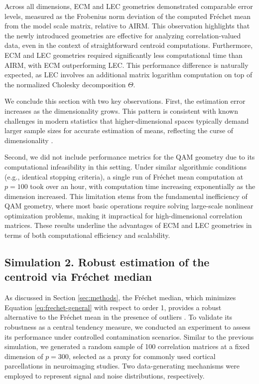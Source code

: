 \documentclass[10pt]{article}
\newcommand{\Frechet}{Fr\'{e}chet }
\begin{document}
Across all dimensions, ECM and LEC geometries demonstrated comparable error levels, measured as the Frobenius norm deviation of the computed \Frechet mean from the model scale matrix, relative to AIRM. This observation highlights that the newly introduced geometries are effective for analyzing correlation-valued data, even in the context of straightforward centroid computations. Furthermore, ECM and LEC geometries required significantly less computational time than AIRM, with ECM outperforming LEC. This performance difference is naturally expected, as LEC involves an additional matrix logarithm computation on top of the normalized Cholesky decomposition $\Theta$.

We conclude this section with two key observations. First, the estimation error increases as the dimensionality grows. This pattern is consistent with known challenges in modern statistics that higher-dimensional spaces typically demand larger sample sizes for accurate estimation of means, reflecting the curse of dimensionality \citep{buhlmann_2011_StatisticsHighDimensionalData}. 

Second, we did not include performance metrics for the QAM geometry due to its computational infeasibility in this setting. Under similar algorithmic conditions (e.g., identical stopping criteria), a single run of \Frechet mean computation at $p=100$ took over an hour, with computation time increasing exponentially as the dimension increased. This limitation stems from the fundamental inefficiency of QAM geometry, where most basic operations require solving large-scale nonlinear optimization problems, making it impractical for high-dimensional correlation matrices. These results underline the advantages of ECM and LEC geometries in terms of both computational efficiency and scalability.














\subsection{Simulation 2. Robust estimation of the centroid via \Frechet median}

As discussed in Section \ref{sec:methods}, the \Frechet median, which minimizes Equation \eqref{eq:frechet-general} with respect to order 1, provides a robust alternative to the \Frechet mean in the presence of outliers \citep{huber_1981_RobustStatistics}. To validate its robustness as a central tendency measure, we conducted an experiment to assess its performance under controlled contamination scenarios. Similar to the previous simulation, we generated a random sample of 100 correlation matrices at a fixed dimension of $p=300$, selected as a proxy for commonly used cortical parcellations in neuroimaging studies. Two data-generating mechanisms were employed to represent signal and noise distributions, respectively.
\end{document}

